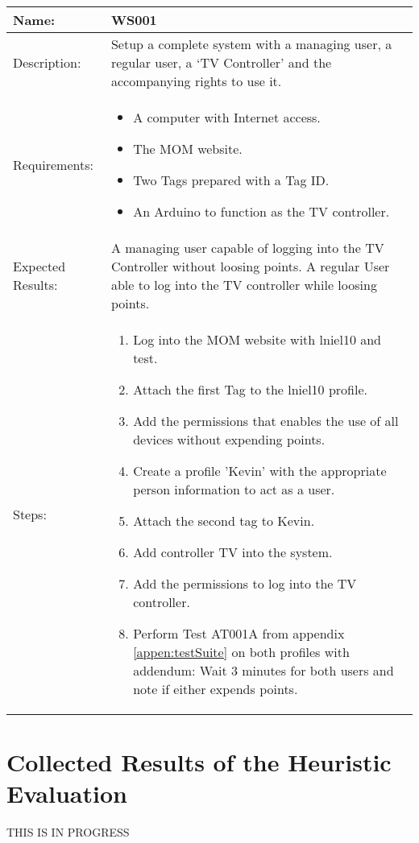 \begin{table}[h]
	\centering
		\begin{tabular*}{\textwidth}{|l|l|}
		\hline
		\hline
		Name: & WS001\\
		\hline
		Description: & \parbox{0.70\textwidth}{Setup a complete system with a managing user, a regular user, a `TV Controller' and the accompanying rights to use it.}\\
		\hline
		Requirements: & \parbox{0.70\textwidth}{
		\begin{itemize}
			\item A computer with Internet access.
			\item The MOM website.
			\item Two Tags prepared with a Tag ID.
			\item An Arduino to function as the TV controller. 
		\end{itemize}}
		\\
		\hline
		Expected Results: & \parbox{.70\textwidth}{A managing user capable of logging into the TV Controller without loosing points. A regular User able to log into the TV controller while loosing points.}\\
		\hline
		Steps: & \parbox{.70\textwidth}{
		\begin{enumerate}
			\item Log into the MOM website with lniel10 and test.
			\item Attach the first Tag to the lniel10 profile.
			\item Add the permissions that enables the use of all devices without expending points.
			\item Create a profile 'Kevin' with the appropriate person information to act as a user.
			\item Attach the second tag to Kevin.
			\item Add controller TV into the system.
			\item Add the permissions to log into the TV controller.
			\item Perform Test AT001A from appendix \vref{appen:testSuite} on both profiles with addendum: Wait 3 minutes for both users and note if either expends points.
		\end{enumerate}}
		\\		
		\hline
		\end{tabular*}
\end{table}


\section{Collected Results of the Heuristic Evaluation}
THIS IS IN PROGRESS
